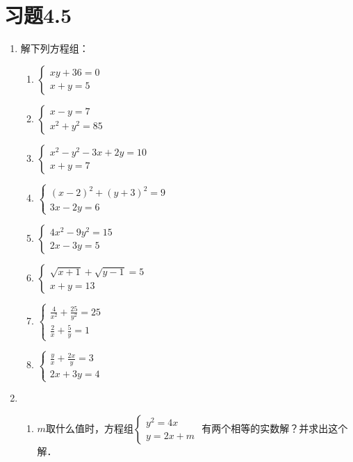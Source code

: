 \section*{习题4.5}
\begin{enumerate}
    \item 解下列方程组：
\begin{multicols}{2}
\begin{enumerate}
    \item $\begin{cases}
        xy+36=0\\x+y=5
    \end{cases}$
    \item $\begin{cases}
        x-y=7\\x^2+y^2=85
    \end{cases}$
    \item $\begin{cases}
        x^2-y^2-3x+2y=10\\x+y=7
    \end{cases}$
    \item $\begin{cases}
        (x-2)^2+(y+3)^2=9\\ 3x-2y=6
    \end{cases}$
    \item $\begin{cases}
        4x^2-9y^2=15\\ 2x-3y=5
    \end{cases}$
    \item $\begin{cases}
        \sqrt{x+1}+\sqrt{y-1}=5\\ x+y=13
    \end{cases}$
    \item $\begin{cases}
        \frac{4}{x^2}+\frac{25}{y^2}=25\\
        \frac{2}{x}+\frac{5}{y}=1
    \end{cases}$
    \item $\begin{cases}
        \frac{y}{x}+\frac{2x}{y}=3\\
        2x+3y=4
    \end{cases}$

\end{enumerate}
\end{multicols}

\item \begin{enumerate}
    \item $m$取什么值时，方程组$\begin{cases}
        y^2=4x\\y=2x+m
    \end{cases}$
有两个相等的实数解？并求出这个解．


\end{enumerate}
\end{enumerate}
